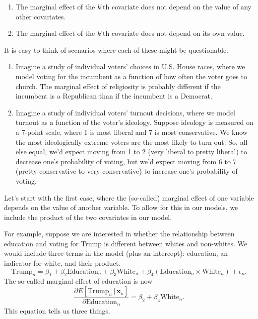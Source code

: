 \documentclass[
  12pt,
  oneside,openany]{book}
\begin{document}
\begin{enumerate}
\def\labelenumi{\arabic{enumi}.}
\item
  The marginal effect of the \(k\)'th covariate does not depend on the value of any other covariates.
\item
  The marginal effect of the \(k\)'th covariate does not depend on its own value.
\end{enumerate}

It is easy to think of scenarios where each of these might be questionable.

\begin{enumerate}
\def\labelenumi{\arabic{enumi}.}
\item
  Imagine a study of individual voters' choices in U.S. House races, where we model voting for the incumbent as a function of how often the voter goes to church. The marginal effect of religiosity is probably different if the incumbent is a Republican than if the incumbent is a Democrat.
\item
  Imagine a study of individual voters' turnout decisions, where we model turnout as a function of the voter's ideology. Suppose ideology is measured on a 7-point scale, where 1 is most liberal and 7 is most conservative. We know the most ideologically extreme voters are the most likely to turn out. So, all else equal, we'd expect moving from 1 to 2 (very liberal to pretty liberal) to decrease one's probability of voting, but we'd expect moving from 6 to 7 (pretty conservative to very conservative) to increase one's probability of voting.
\end{enumerate}

Let's start with the first case, where the (so-called) marginal effect of one variable depends on the value of another variable. To allow for this in our models, we include the product of the two covariates in our model.

For example, suppose we are interested in whether the relationship between education and voting for Trump is different between whites and non-whites. We would include three terms in the model (plus an intercept): education, an indicator for white, and their product.
\[
\text{Trump}_n = \beta_1 + \beta_2 \text{Education}_n + \beta_3 \text{White}_n + \beta_4 (\text{Education}_n \times \text{White}_n) + \epsilon_n.
\]
The so-called marginal effect of education is now
\[
\frac{\partial{}E[\text{Trump}_n \,|\, \mathbf{x}_n]}{\partial{}\text{Education}_n}
= \beta_2 + \beta_4 \text{White}_n.
\]
This equation tells us three things.
\end{document}
